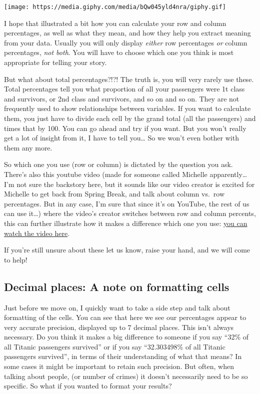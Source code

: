 \documentclass[
]{book}
\begin{document}
\texttt{[image: https://media.giphy.com/media/bQw045yld4nra/giphy.gif]}

I hope that illustrated a bit how you can calculate your row and column percentages, as well as what they mean, and how they help you extract meaning from your data. Usually you will only display \emph{either} row percentages \emph{or} column percentages, \emph{not both}. You will have to choose which one you think is most appropriate for telling your story.

But what about total percentages?!?! The truth is, you will very rarely use these. Total percentages tell you what proportion of all your passengers were 1t class and survivors, or 2nd class and survivors, and so on and so on. They are not frequently used to show relationships between variables. If you want to calculate them, you just have to divide each cell by the grand total (all the passengers) and times that by 100. You can go ahead and try if you want. But you won't really get a lot of insight from it, I have to tell you\ldots{} So we won't even bother with them any more.

So which one you use (row or column) is dictated by the question you ask. There's also this youtube video (made for someone called Michelle apparently\ldots{} I'm not sure the backstory here, but it sounds like our video creator is excited for Michelle to get back from Spring Break, and talk about column vs.~row percentages. But in any case, I'm sure that since it's on YouTube, the rest of us can use it\ldots) where the video's creator switches between row and column percents, this can further illustrate how it makes a difference which one you use: \href{https://www.youtube.com/watch?v=cdvTpnHwKjs}{you can watch the video here}.

If you're still unsure about these let us know, raise your hand, and we will come to help!

\hypertarget{decimal-places-a-note-on-formatting-cells}{%
\subsection{Decimal places: A note on formatting cells}\label{decimal-places-a-note-on-formatting-cells}}

Just before we move on, I quickly want to take a side step and talk about formatting of the cells. You can see that here we see our percentages appear to very accurate precision, displayed up to 7 decimal places. This isn't always necessary. Do you think it makes a big difference to someone if you say ``32\% of all Titanic passengers survived'' or if you say ``32.303498\% of all Titanic passengers survived'', in terms of their understanding of what that means? In some cases it might be important to retain such precision. But often, when talking about people, (or number of crimes) it doesn't necessarily need to be so specific. So what if you wanted to format your results?
\end{document}
